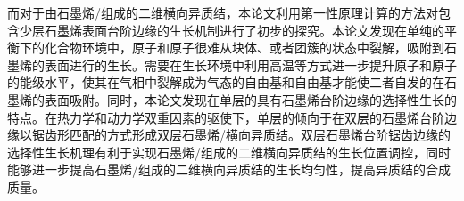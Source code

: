     而对于由石墨烯/组成的二维横向异质结，本论文利用第一性原理计算的方法对包含少层石墨烯表面台阶边缘的生长机制进行了初步的探究。本论文发现在单纯的平衡下的化合物环境中，原子和原子很难从块体、或者团簇的状态中裂解，吸附到石墨烯的表面进行的生长。需要在生长环境中利用高温等方式进一步提升原子和原子的能级水平，使其在气相中裂解成为气态的自由基和自由基才能使二者自发的在石墨烯的表面吸附。同时，本论文发现在单层的具有石墨烯台阶边缘的选择性生长的特点。在热力学和动力学双重因素的驱使下，单层的倾向于在双层的石墨烯台阶边缘以锯齿形匹配的方式形成双层石墨烯/横向异质结。双层石墨烯台阶锯齿边缘的选择性生长机理有利于实现石墨烯/组成的二维横向异质结的生长位置调控，同时能够进一步提高石墨烯/组成的二维横向异质结的生长均匀性，提高异质结的合成质量。